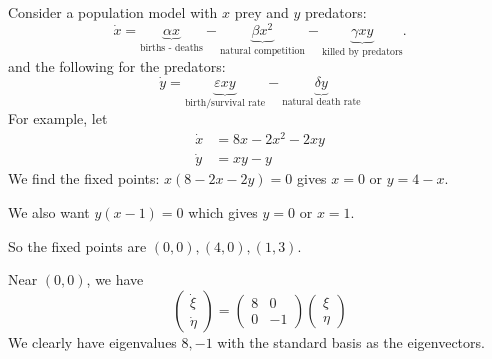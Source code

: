 \documentclass[a4paper]{article}
\begin{document}
\begin{eg}
  Consider a population model with $x$ prey and $y$ predators:
  \[
    \dot x = \underbrace{\alpha x}_{\text{births - deaths}} - \underbrace{\beta x^2}_{\text{natural competition}} - \underbrace{\gamma xy}_{\text{killed by predators}}.
  \]
  and the following for the predators:
  \[
    \dot y = \underbrace{\varepsilon xy}_{\text{birth/survival rate}} - \underbrace{\delta y}_{\text{natural death rate}}
  \]
  For example, let
  \begin{align*}
    \dot x &= 8x - 2x^2 - 2xy\\
    \dot y &= xy - y
  \end{align*}
  We find the fixed points: $x(8 - 2x - 2y) = 0$ gives $x = 0$ or $y = 4 - x$.

  We also want $y(x - 1) = 0$ which gives $y = 0$ or $x = 1$.

  So the fixed points are $(0, 0), (4, 0), (1, 3)$.

  Near $(0, 0)$, we have
  \[
    \begin{pmatrix}
      \dot \xi\\\dot \eta
    \end{pmatrix}=
    \begin{pmatrix}
      8 & 0\\
      0 & -1
    \end{pmatrix}
    \begin{pmatrix}
      \xi\\
      \eta
    \end{pmatrix}
  \]
  We clearly have eigenvalues $8, -1$ with the standard basis as the eigenvectors.
  \begin{center}
\end{center}
\end{eg}
\end{document}

